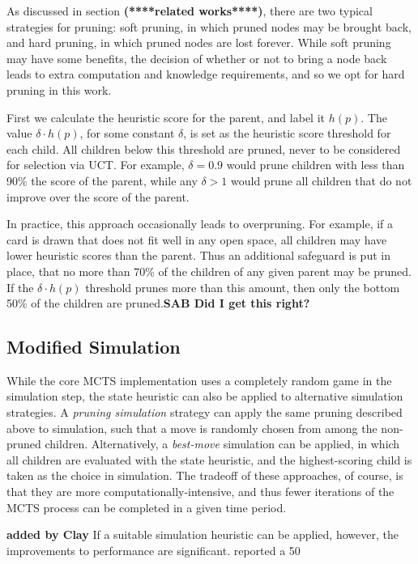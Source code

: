 \documentclass[letterpaper]{article}
\begin{document}
As discussed in section {\bf (****related works****)}, there are two typical strategies for pruning: soft pruning, in which pruned nodes may be brought back, and hard pruning, in which pruned nodes are lost forever. While soft pruning may have some benefits, the decision of whether or not to bring a node back leads to extra computation and knowledge requirements, and so we opt for hard pruning in this work.

First we calculate the heuristic score for the parent, and label it $h(p)$. The value $\delta \cdot h(p)$, for some constant $\delta$, is set as the heuristic score threshold for each child. All children below this threshold are pruned, never to be considered for selection via UCT. For example, $\delta = 0.9$ would prune children with less than 90\% the score of the parent, while any $\delta > 1$ would prune all children that do not improve over the score of the parent.

In practice, this approach occasionally leads to overpruning. For example, if a card is drawn that does not fit well in any open space, all children may have lower heuristic scores than the parent. Thus an additional safeguard is put in place, that no more than 70\% of the children of any given parent may be pruned. If the  $\delta \cdot h(p)$ threshold prunes more than this amount, then only the bottom 50\% of the children are pruned.{\bf SAB Did I get this right?}

\subsection{Modified Simulation}

While the core MCTS implementation uses a completely random game in the simulation step, the state heuristic can also be applied to alternative simulation strategies. A {\it pruning simulation} strategy can apply the same pruning described above to simulation, such that a move is randomly chosen from among the non-pruned children. Alternatively, a {\it best-move} simulation can be applied, in which all children are evaluated with the state heuristic, and the highest-scoring child is taken as the choice in simulation. The tradeoff of these approaches, of course, is that they are more computationally-intensive, and thus fewer iterations of the MCTS process can be completed in a given time period. 

{\bf added by Clay} If a suitable simulation heuristic can be applied, however, the improvements to performance are significant. \cite{schadd2012single} reported a 50%
\end{document}
